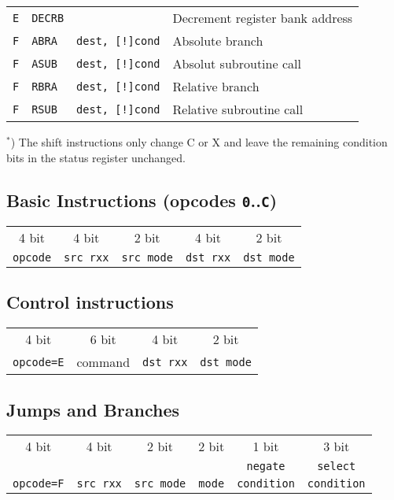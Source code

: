 \documentclass{leaflet}
\begin{document}
{\begin{center}
\begin{longtable}{|c|ll|l|}
      {\tt E}&{\tt DECRB}&&Decrement register bank address\\
      {\tt F}&{\tt ABRA}&{\tt dest, [!]cond}&Absolute branch\\
      {\tt F}&{\tt ASUB}&{\tt dest, [!]cond}&Absolut subroutine call\\
      {\tt F}&{\tt RBRA}&{\tt dest, [!]cond}&Relative branch\\
      {\tt F}&{\tt RSUB}&{\tt dest, [!]cond}&Relative subroutine call\\
     \hline
    \end{longtable}
   \end{center}
   \vspace*{-12mm}
   {\small $^*$) The shift instructions only change C or X and leave the
    remaining condition bits in the status register unchanged.}
   \vspace*{-5mm}
  }
%
  \subsection{Basic Instructions (opcodes \texttt{0}..\texttt{C})}
   \begin{center}
    \begin{longtable}{|c||c|c||c|c|}
     \hline
     4 bit&4 bit&2 bit&4 bit&2 bit\\
     {\tt opcode}&{\tt src rxx}&{\tt src mode}&
     {\tt dst rxx}&{\tt dst mode}\\
     \hline
    \end{longtable}
   \end{center}
  \vspace*{-14mm}
%
  \subsection{Control instructions}
    \begin{center}
     \begin{longtable}{|c||c||c|c|}
      \hline
      4 bit&6 bit&4 bit&2 bit\\
      {\tt opcode=E}&command&\texttt{dst rxx}&\texttt{dst mode}\\
      \hline
     \end{longtable}
    \end{center}
   \vspace*{-13mm}
%
  \subsection{Jumps and Branches}
   {\scriptsize
    \begin{center}
     \begin{longtable}{|c||c|c||c||c|c|}
      \hline
      4 bit&4 bit&2 bit&2 bit&1 bit&3 bit\\
      &     &     &     &{\tt negate}&{\tt select}\\
      {\tt opcode=F}&{\tt src rxx}&{\tt src mode}&
      {\tt mode}&{\tt condition}&{\tt condition}\\
      \hline
     \end{longtable}
    \end{center}
   }
   \vspace*{-13mm}
%
\end{document}
